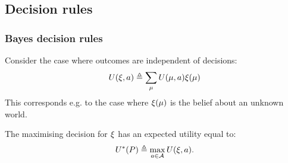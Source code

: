\subsection{Decision rules}


\begin{frame}
  \frametitle{Bayes decision rules}
  Consider the case where outcomes are independent of decisions:
  \[
  U (\xi, a) \mathrel{\triangleq} \sum_{\mu}  U (\mu, a) \xi(\mu)
  \]
  This corresponds e.g. to the case where $\xi(\mu)$ is the belief about an unknown world.
  \begin{definition}
    \label{def:bayes-utility}
    The maximising decision for $\xi$ has an expected utility equal to:
    \begin{equation}
      U^*(P) \mathrel{\triangleq} \max_{a \in \mathcal{A}} U (\xi, a).
      \label{eq:bayes-utility}
    \end{equation}
  \end{definition}
\end{frame}




